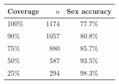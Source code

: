 \begin{tabular}{lrc}
\toprule
Coverage & $n$ & Sex accuracy \\
\midrule
100\% & 1174 & 77.7\% \\
90\% & 1057 & 80.8\% \\
75\% & 880 & 85.7\% \\
50\% & 587 & 93.5\% \\
25\% & 294 & 98.3\% \\
\bottomrule
\end{tabular}
